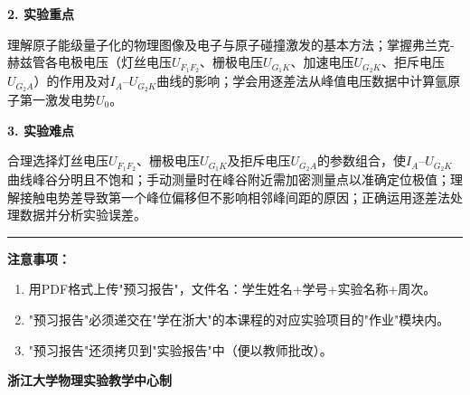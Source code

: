 \documentclass[a4paper,12pt]{article}
\begin{document}
\vspace{0.5cm}

{\fontsize{14pt}{20pt}\selectfont \textbf{2. 实验重点}}

\vspace{0.3cm}

{\fontsize{12pt}{18pt}\selectfont

理解原子能级量子化的物理图像及电子与原子碰撞激发的基本方法；掌握弗兰克-赫兹管各电极电压（灯丝电压$U_{F_1F_2}$、栅极电压$U_{G_1K}$、加速电压$U_{G_2K}$、拒斥电压$U_{G_2A}$）的作用及对$I_A$--$U_{G_2K}$曲线的影响；学会用逐差法从峰值电压数据中计算氩原子第一激发电势$U_0$。

}

\vspace{0.5cm}

{\fontsize{14pt}{20pt}\selectfont \textbf{3. 实验难点}}

\vspace{0.3cm}

{\fontsize{12pt}{18pt}\selectfont

合理选择灯丝电压$U_{F_1F_2}$、栅极电压$U_{G_1K}$及拒斥电压$U_{G_2A}$的参数组合，使$I_A$--$U_{G_2K}$曲线峰谷分明且不饱和；手动测量时在峰谷附近需加密测量点以准确定位极值；理解接触电势差导致第一个峰位偏移但不影响相邻峰间距的原因；正确运用逐差法处理数据并分析实验误差。

}

\vfill

\noindent\rule{\textwidth}{0.4pt}

{\fontsize{12pt}{18pt}\selectfont
\textbf{注意事项：}
\begin{enumerate}[label=\arabic*., leftmargin=2em, nosep]
    \item 用PDF格式上传"预习报告"，文件名：学生姓名+学号+实验名称+周次。
    \item "预习报告"必须递交在"学在浙大"的本课程的对应实验项目的"作业"模块内。
    \item "预习报告"还须拷贝到"实验报告"中（便以教师批改）。
\end{enumerate}
}

\vspace{0.5cm}
\begin{center}
    {\fontsize{12pt}{18pt}\selectfont \textbf{浙江大学物理实验教学中心制}}
\end{center}
\end{document}
